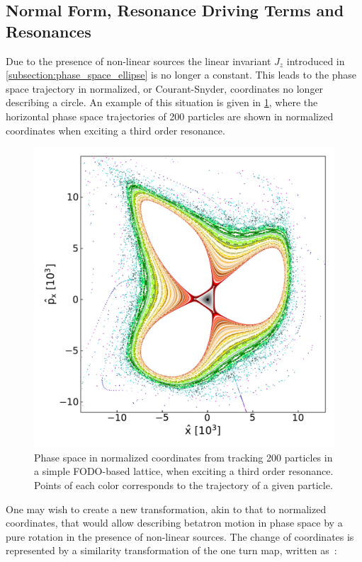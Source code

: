 \subsection{Normal Form, Resonance Driving Terms and Resonances}
\label{subsection:normal_form_and_rdt}

Due to the presence of non-linear sources the linear invariant \(J_z\) introduced in \cref{subsection:phase_space_ellipse} is no longer a constant.
This leads to the phase space trajectory in normalized, or Courant-Snyder, coordinates no longer describing a circle.
An example of this situation is given in \cref{figure:phase_space_third_order_resonance}, where the horizontal phase space trajectories of \num{200} particles are shown in normalized coordinates when exciting a third order resonance.

\begin{figure}[!htb]
    \centering
    \includegraphics[width = 0.9\linewidth]{Figures/Beam_Dynamics_Theory/phase_space_third_order_resonance.pdf}
    \caption{Phase space in normalized coordinates from tracking \num{200} particles in a simple FODO-based lattice, when exciting a third order resonance. Points of each color corresponds to the trajectory of a given particle.}
    \label{figure:phase_space_third_order_resonance}
\end{figure}

One may wish to create a new transformation, akin to that to normalized coordinates, that would allow describing betatron motion in phase space by a pure rotation in the presence of non-linear sources.
The change of coordinates is represented by a similarity transformation of the one turn map, written as~\cite{PHD:Tomas}:

